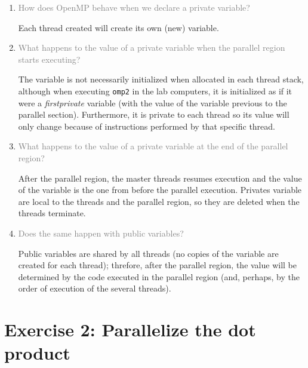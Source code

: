 \documentclass{article}
\begin{document}
\begin{enumerate}
\item \textcolor{gray}{How does OpenMP behave when we declare a private variable?}

Each thread created will create its own (new) variable.

\item \textcolor{gray}{What happens to the value of a private variable when the parallel region starts executing?}

The variable is not necessarily initialized when allocated in each thread stack, although when executing \texttt{omp2} in the lab computers, it is initialized as if it were a \emph{firstprivate} variable (with the value of the variable previous to the parallel section). Furthermore, it is private to each thread so its value will only change because of instructions performed by that specific thread.

\item \textcolor{gray}{What happens to the value of a private variable at the end of the parallel region?}

After the parallel region, the master threads resumes execution and the value of the variable is the one from before the parallel execution. Privates variable are local to the threads and the parallel region, so they are deleted when the threads terminate.

\item \textcolor{gray}{Does the same happen with public variables?}

Public variables are shared by all threads (no copies of the variable are created for each thread); threfore, after the parallel region, the value will be determined by the code executed in the parallel region (and, perhaps, by the order of execution of the several threads).

\end{enumerate}

\section{Exercise 2: Parallelize the dot product}
\end{document}
